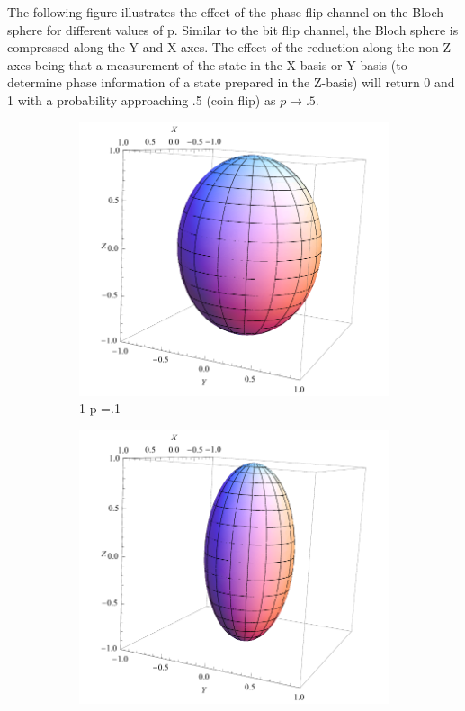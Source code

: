 \documentclass[letterpaper,twoside,10pt]{article}
\begin{document}
The following figure illustrates the effect of the phase flip channel on the Bloch sphere for different values of p. Similar to the bit flip channel, the Bloch sphere is compressed along the Y and X axes. The effect of the reduction along the non-Z axes being that a measurement of the state in the X-basis or Y-basis (to determine phase information of a state prepared in the Z-basis) will return 0 and 1 with a probability approaching .5 (coin flip) as $p\rightarrow .5$.

\begin{figure}[H]%
\centering
	\begin{subfigure}{.3\textwidth}
		\includegraphics[width=\columnwidth,natwidth=300,natheight=300]{./PhaseFlip/PhaseFlipPoint1.pdf}%
		\caption{1-p =.1}%
	\end{subfigure}
	\begin{subfigure}{.3\textwidth}
		\includegraphics[width=\columnwidth,natwidth=300,natheight=300]{./PhaseFlip/PhaseFlipPoint25.pdf}%

\end{subfigure}
\end{figure}
\end{document}
